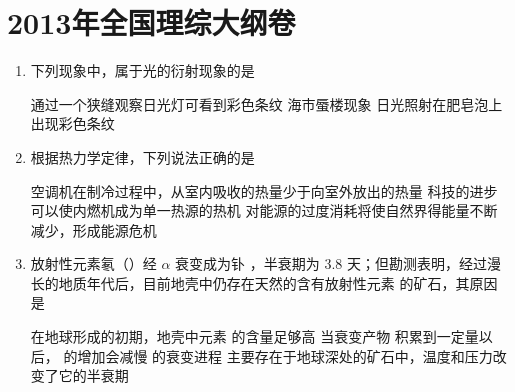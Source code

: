 \documentclass[\gkver]{gaokaozhenti}
\begin{document}
\chapter{2013年全国理综大纲卷}

\begin{enumerate}
\item
下列现象中，属于光的衍射现象的是

{通过一个狭缝观察日光灯可看到彩色条纹}
{海市蜃楼现象}
{日光照射在肥皂泡上出现彩色条纹}


\item
根据热力学定律，下列说法正确的是

{空调机在制冷过程中，从室内吸收的热量少于向室外放出的热量}
{科技的进步可以使内燃机成为单一热源的热机}
{对能源的过度消耗将使自然界得能量不断减少，形成能源危机}


\item
放射性元素氡（）经 $\alpha$ 衰变成为钋 ，半衰期为 3.8 天；但勘测表明，经过漫长的地质年代后，目前地壳中仍存在天然的含有放射性元素  的矿石，其原因是

{在地球形成的初期，地壳中元素  的含量足够高}
{当衰变产物  积累到一定量以后， 的增加会减慢  的衰变进程}
{ 主要存在于地球深处的矿石中，温度和压力改变了它的半衰期}



\end{enumerate}
\end{document}
